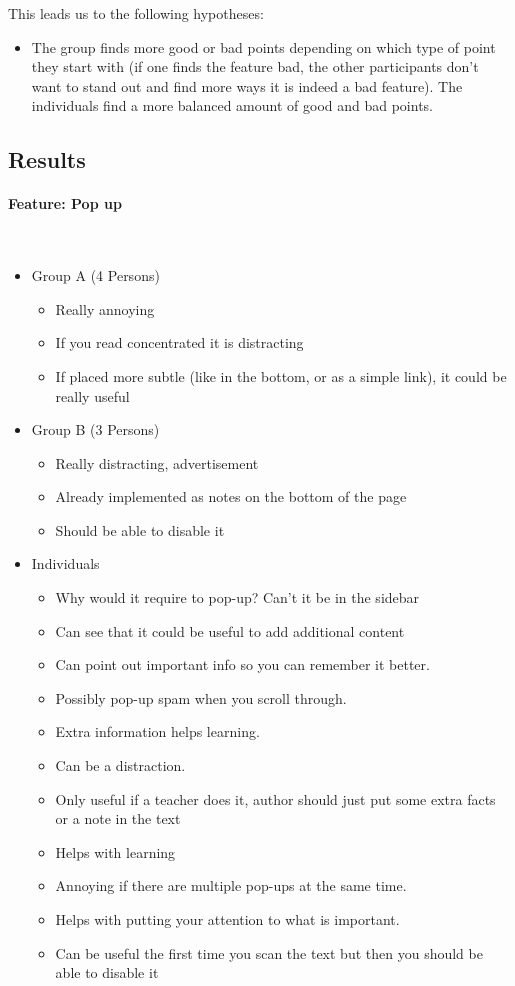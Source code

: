 \documentclass[main.tex]{subfiles}
\begin{document}
This leads us to the following hypotheses:
\begin{itemize}
\item The group finds more good or bad points depending on which type of point they start with (if one finds the feature bad, the other participants don't want to stand out and find more ways it is indeed a bad feature). The individuals find a more balanced amount of good and bad points.
\end{itemize}

\subsection{Results}
\paragraph{Feature: Pop up}~
\begin{itemize}
	\item Group A (4 Persons)
		\begin{itemize}
			\item Really annoying
			\item If you read concentrated it is distracting
			\item If placed more subtle (like in the bottom, or as a simple link), it could be really useful
		\end{itemize}
	\item Group B (3 Persons)
		\begin{itemize}
			\item Really distracting, advertisement
			\item Already implemented as notes on the bottom of the page
			\item Should be able to disable it
		\end{itemize}
	\item Individuals
		\begin{itemize}
      \item Why would it require to pop-up? Can't it be in the sidebar  %
      \item Can see that it could be useful to add additional content   %
			\item Can point out important info so you can remember it better.
			\item Possibly pop-up spam when you scroll through.
			\item Extra information helps learning.
			\item Can be a distraction.
			\item Only useful if a teacher does it, author should just put some extra facts or a note in the text
			\item Helps with learning
			\item Annoying if there are multiple pop-ups at the same time.
			\item Helps with putting your attention to what is important.
			\item Can be useful the first time you scan the text but then you should be able to disable it
		\end{itemize}
\end{itemize}
\end{document}
